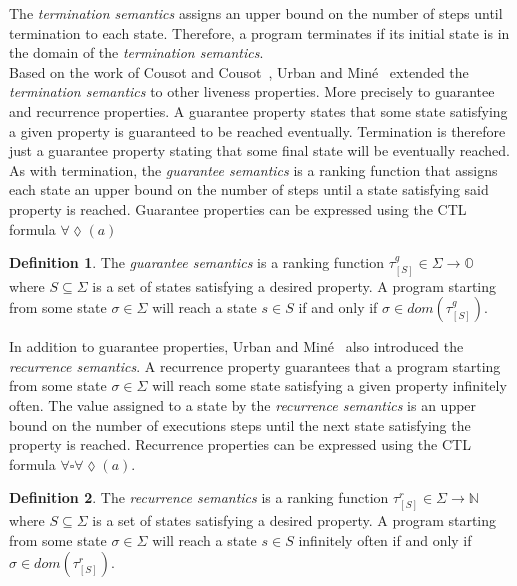 \documentclass[11pt,a4paper,titlepage]{article}
\theoremstyle{definition}
\newtheorem{definition}{Definition}[section]
\begin{document}
The \textit{termination semantics} assigns an upper bound on the number of steps until termination to each state. 
Therefore, a program terminates if its initial state is in the domain of the \textit{termination semantics}.\\

Based on the work of Cousot and Cousot~\cite{CousotCousot-POPL12}, Urban and Miné~\cite{UrbanM-VMCAI15} extended the 
\textit{termination semantics} to other liveness properties. More precisely to guarantee and recurrence properties. 
A guarantee property states that some state satisfying a given property is guaranteed to be reached eventually. 
Termination is therefore just a guarantee property stating that some final state will be eventually reached. 
As with termination, the \textit{guarantee semantics} is a ranking function that assigns each state an upper bound on the number of steps
until a state satisfying said property is reached. Guarantee properties can be expressed using the CTL formula $\forall\lozenge(a)$

\begin{definition}
    The \textit{guarantee semantics} is a ranking function 
    $\tau_{[S]}^{g} \in \Sigma \rightarrow \mathbb{O}$
    where $S \subseteq \Sigma$ is a set of states satisfying a desired property.
    A program starting from some state $\sigma \in \Sigma$ will reach a state 
    $s \in S$ if and only if $\sigma \in dom(\tau_{[S]}^{g})$.
\end{definition}

In addition to guarantee properties, Urban and Miné~\cite{UrbanM-VMCAI15} also introduced the \textit{recurrence semantics}.
A recurrence property guarantees that a program starting from some state $\sigma \in \Sigma$ will reach some state satisfying
a given property infinitely often. The value assigned to a state by the \textit{recurrence semantics}
is an upper bound on the number of executions steps until the next state satisfying the property is reached. 
Recurrence properties can be expressed using the CTL formula $\forall\square\forall\lozenge(a)$.

\begin{definition}
    The \textit{recurrence semantics} is a ranking function 
    $\tau_{[S]}^{r} \in \Sigma \rightarrow \mathbb{N}$
    where $S \subseteq \Sigma$ is a set of states satisfying a desired property.
    A program starting from some state $\sigma \in \Sigma$ will reach a state 
    $s \in S$ infinitely often if and only if $\sigma \in dom(\tau_{[S]}^{r})$.
\end{definition}
\end{document}
